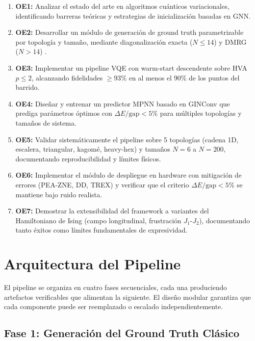 \documentclass[11pt,a4paper,spanish]{book}
\begin{document}
\begin{enumerate}
    \item \textbf{OE1:} Analizar el estado del arte en algoritmos cuánticos variacionales, identificando barreras teóricas y estrategias de inicialización basadas en GNN.

    \item \textbf{OE2:} Desarrollar un módulo de generación de ground truth parametrizable por topología y tamaño, mediante diagonalización exacta ($N \leq 14$) y DMRG ($N > 14$) \citep{hauschild2018}.

    \item \textbf{OE3:} Implementar un pipeline VQE con warm-start descendente sobre HVA $p \leq 2$, alcanzando fidelidades $\geq 93\%$ en al menos el 90\% de los puntos del barrido.

    \item \textbf{OE4:} Diseñar y entrenar un predictor MPNN basado en GINConv que prediga parámetros óptimos con $\Delta E/\text{gap} < 5\%$ para múltiples topologías y tamaños de sistema.

    \item \textbf{OE5:} Validar sistemáticamente el pipeline sobre 5 topologías (cadena 1D, escalera, triangular, kagomé, heavy-hex) y tamaños $N = 6$ a $N = 200$, documentando reproducibilidad y límites físicos.

    \item \textbf{OE6:} Implementar el módulo de despliegue en hardware con mitigación de errores (PEA-ZNE, DD, TREX) y verificar que el criterio $\Delta E/\text{gap} < 5\%$ se mantiene bajo ruido realista.

    \item \textbf{OE7:} Demostrar la extensibilidad del framework a variantes del Hamiltoniano de Ising (campo longitudinal, frustración $J_1$-$J_2$), documentando tanto éxitos como límites fundamentales de expresividad.
\end{enumerate}

\section{Arquitectura del Pipeline}

El pipeline se organiza en cuatro fases secuenciales, cada una produciendo artefactos verificables que alimentan la siguiente. El diseño modular garantiza que cada componente puede ser reemplazado o escalado independientemente.

\subsection{Fase 1: Generación del Ground Truth Clásico}
\end{document}
